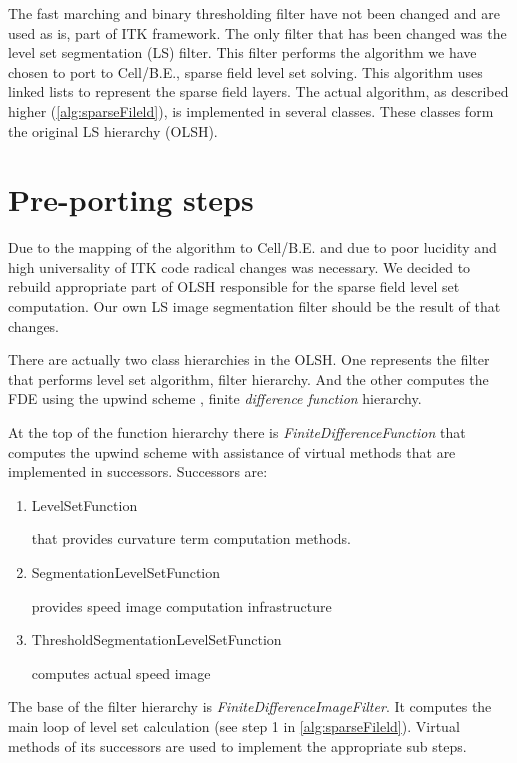 The fast marching and binary thresholding filter have not been changed and are used as is, part of ITK framework.
The only filter that has been changed was the level set segmentation (LS) filter.
This filter performs the algorithm we have chosen to port to \mbox{Cell/B.E.}, sparse field level set solving.
This algorithm uses linked lists to represent the sparse field layers.
The actual algorithm, as described higher (\ref{alg:sparseFileld}), is implemented in several classes.
These classes form the original LS hierarchy (OLSH).

\section{Pre-porting steps}
\par
Due to the mapping of the algorithm to \mbox{Cell/B.E.} and due to poor lucidity and high universality of ITK code radical changes was necessary.
We decided to rebuild appropriate part of OLSH responsible for the sparse field level set computation.
Our own LS image segmentation filter should be the result of that changes.

\par
There are actually two class hierarchies in the OLSH.
One represents the filter that performs level set algorithm, filter hierarchy.
And the other computes the FDE using the upwind scheme \cite{sethianLS}, finite \emph{difference function} hierarchy.

\par
At the top of the function hierarchy there is \mbox{\emph{FiniteDifferenceFunction}} that computes the upwind scheme with assistance of virtual methods that are implemented in successors.
Successors are:
\begin{enumerate}
  \item{LevelSetFunction}
  \par
  that provides curvature term computation methods.

\item{SegmentationLevelSetFunction}
\par
provides speed image computation infrastructure

\item{ThresholdSegmentationLevelSetFunction}
\par
computes actual speed image
\end{enumerate}

\par
The base of the filter hierarchy is \mbox{\emph{FiniteDifferenceImageFilter}}.
It computes the main loop of level set calculation (see step 1 in \ref{alg:sparseFileld}).
Virtual methods of its successors are used to implement the appropriate sub steps.

